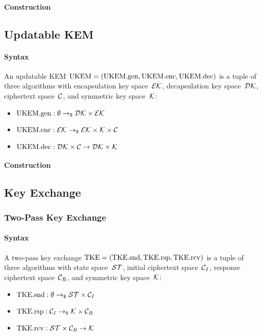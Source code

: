 \documentclass[a4paper,orivec]{llncs}
\begin{document}
\paragraph{Construction}


\subsection{Updatable KEM}

\paragraph{Syntax}
An updatable KEM $\mathrm{UKEM}=(\mathrm{UKEM}.\mathrm{gen},\mathrm{UKEM}.\mathrm{enc},\mathrm{UKEM}.\mathrm{dec})$ is a tuple of three algorithms with encapsulation key space~$\mathcal{EK}$, decapsulation key space~$\mathcal{DK}$, ciphertext space~$\mathcal{C}$, and symmetric key space~$\mathcal{K}$:

\begin{itemize}
    \item $\mathrm{UKEM}.\mathrm{gen}: \emptyset \to_\$ \mathcal{DK}\times\mathcal{EK}$
    \item $\mathrm{UKEM}.\mathrm{enc}: \mathcal{EK} \to_\$ \mathcal{EK}\times\mathcal{K}\times\mathcal{C}$
    \item $\mathrm{UKEM}.\mathrm{dec}: \mathcal{DK}\times\mathcal{C} \to \mathcal{DK}\times\mathcal{K}$
\end{itemize}

\paragraph{Construction}


\subsection{Key Exchange}

\subsubsection{Two-Pass Key Exchange}

\paragraph{Syntax}
A two-pass key exchange $\mathrm{TKE}=(\mathrm{TKE}.\mathrm{snd},\mathrm{TKE}.\mathrm{rsp},\mathrm{TKE}.\mathrm{rcv})$ is a tuple of three algorithms with state space~$\mathcal{ST}$, initial ciphertext space~$\mathcal{C}_I$, response ciphertext space~$\mathcal{C}_R$, and symmetric key space~$\mathcal{K}$:

\begin{itemize}
    \item $\mathrm{TKE}.\mathrm{snd}: \emptyset \to_\$ \mathcal{ST}\times\mathcal{C}_I$
    \item $\mathrm{TKE}.\mathrm{rsp}: \mathcal{C}_I \to_\$ \mathcal{K}\times\mathcal{C}_R$
    \item $\mathrm{TKE}.\mathrm{rcv}: \mathcal{ST}\times\mathcal{C}_R \to \mathcal{K}$
\end{itemize}
\end{document}
